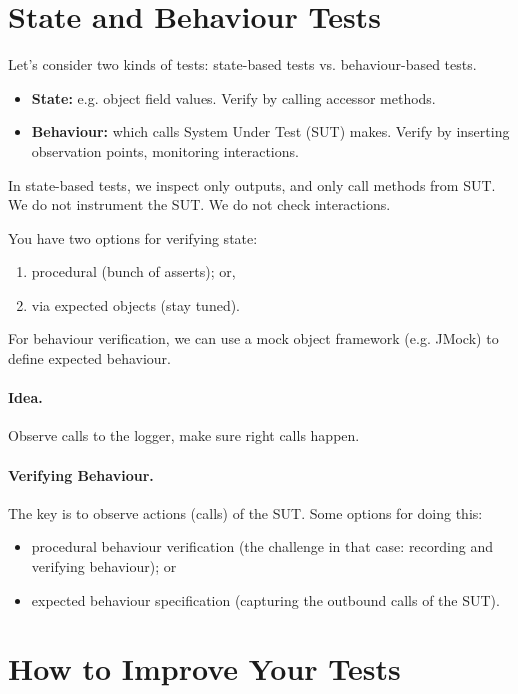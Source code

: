 \documentclass[11pt]{article}
\begin{document}
\section*{State and Behaviour Tests}

Let's consider two kinds of
tests: state-based tests vs. behaviour-based tests.

\begin{itemize}[noitemsep]
\item {\bf State:} e.g. object field values.
    Verify by calling accessor methods.
  \item {\bf Behaviour:} which calls System Under Test (SUT) makes.
    Verify by inserting observation points, monitoring interactions.
\end{itemize}

In state-based tests, we inspect only outputs, and only call methods from SUT. We do not instrument the SUT. We do not check interactions.

You have two options for verifying state:
\begin{enumerate}[noitemsep]
\item procedural (bunch of asserts); or,
\item via expected objects (stay tuned).
\end{enumerate}

For behaviour verification, we can use a mock object framework (e.g. JMock) to
define expected behaviour.

\paragraph{Idea.} Observe calls to the logger,
make sure right calls happen.

\paragraph{Verifying Behaviour.} The key is to observe actions
(calls) of the SUT. Some options for doing this:
\begin{itemize}[noitemsep]
\item procedural behaviour verification
  (the challenge in that case: recording and verifying behaviour); or
\item expected behaviour specification
  (capturing the outbound calls of the SUT).
\end{itemize}

\section*{How to Improve Your Tests}
\end{document}

